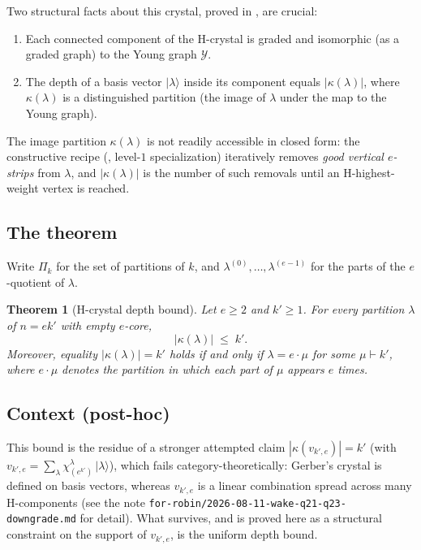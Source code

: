 \documentclass[11pt]{article}
\newtheorem{theorem}{Theorem}
\theoremstyle{definition}
\begin{document}
Two structural facts about this crystal, proved in \cite[Prop.~3.12]{Gerber},
are crucial:
\begin{enumerate}
    \item[(i)] Each connected component of the H-crystal is graded and
        isomorphic (as a graded graph) to the Young graph $\mathcal{Y}$.
    \item[(ii)] The depth of a basis vector $|\lambda\rangle$ inside its
        component equals $|\kappa(\lambda)|$, where $\kappa(\lambda)$ is a
        distinguished partition (the image of $\lambda$ under the map to the
        Young graph).
\end{enumerate}
The image partition $\kappa(\lambda)$ is not readily accessible in closed
form: the constructive recipe (\cite[Thm.~5.11]{Gerber}, level-$1$
specialization) iteratively removes \emph{good vertical $e$-strips} from
$\lambda$, and $|\kappa(\lambda)|$ is the number of such removals until an
H-highest-weight vertex is reached.

\subsection{The theorem}
Write $\Pi_k$ for the set of partitions of $k$, and $\lambda^{(0)}, \ldots,
\lambda^{(e-1)}$ for the parts of the $e$-quotient of $\lambda$.

\begin{theorem}[H-crystal depth bound]
\label{thm:main}
Let $e \ge 2$ and $k' \ge 1$. For every partition $\lambda$ of $n = ek'$
with empty $e$-core,
\[
    |\kappa(\lambda)| \;\le\; k'.
\]
Moreover, equality $|\kappa(\lambda)| = k'$ holds if and only if
$\lambda = e \cdot \mu$ for some $\mu \vdash k'$, where $e \cdot \mu$ denotes
the partition in which each part of $\mu$ appears $e$ times.
\end{theorem}

\subsection{Context (post-hoc)}
This bound is the residue of a stronger attempted claim
$|\kappa(v_{k',e})| = k'$ (with $v_{k',e} = \sum_\lambda
\chi^\lambda_{(e^{k'})}\,|\lambda\rangle$), which fails category-theoretically:
Gerber's crystal is defined on basis vectors, whereas $v_{k',e}$ is a linear
combination spread across many H-components (see the note
\texttt{for-robin/2026-08-11-wake-q21-q23-downgrade.md} for detail). What
survives, and is proved here as a structural constraint on the support of
$v_{k',e}$, is the uniform depth bound.
\end{document}
